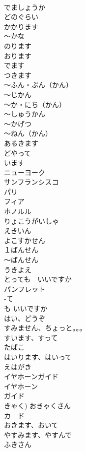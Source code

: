 \documentclass[8pt]{extreport}
\begin{document}
\begin{CJK}{UTF8}{min}
\\	でましょうか		
\\	どのぐらい		
\\	かかります		
\\	〜かな		
\\	のります		
\\	おります		
\\	でます		
\\	つきます		
\\	〜ふん・ぶん（かん）		
\\	〜じかん		
\\	〜か・にち（かん）		
\\	〜しゅうかん		
\\	〜かげつ		
\\	〜ねん（かん）		
\\	あるきます		
\\	どやって		
\\	います		
\\	ニューヨーク		
\\	サンフランシスコ		
\\	パリ		
\\	フィア		
\\	ホノルル		
\\	りょこうがいしゃ		
\\	えきいん		
\\	よこすかせん		
\\	１ばんせん		
\\	〜ばんせん		
\\	うきよえ		
\\	とっても　いいですか		
\\	パンフレット		
\\	-て 
\\	も いいですか		
\\	はい、どうぞ		
\\	すみません、ちょっと。。。		
\\	すいます、すって		
\\	たばこ		
\\	はいります、はいって		
\\	えはがき		
\\	イヤホーンガイド		
\\	イヤホーン		
\\	ガイド		
\\	きゃく)	おきゃくさん		
\\	カ＿ド		
\\	おきます、おいて		
\\	やすみます、やすんで		
\\	ふきさん		

\end{CJK}
\end{document}
